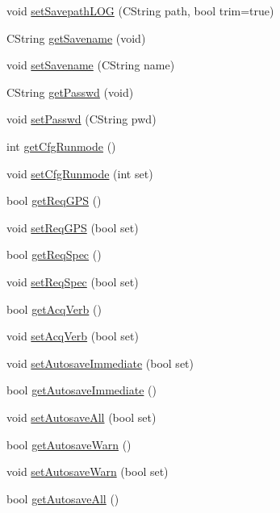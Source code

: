 \begin{DoxyCompactItemize}
\item 
void \hyperlink{classCspec4Cfg_ad3259b17a8c14bddac4b3812ab4dd6f7}{setSavepathLOG} (CString path, bool trim=true)
\item 
CString \hyperlink{classCspec4Cfg_a26c3a0c879839520662be22a06091e16}{getSavename} (void)
\item 
void \hyperlink{classCspec4Cfg_a3a4cfd79bd07ee09cb2ff660f4a81a29}{setSavename} (CString name)
\item 
CString \hyperlink{classCspec4Cfg_aa3610b0f5740435b57663b89df054948}{getPasswd} (void)
\item 
void \hyperlink{classCspec4Cfg_afc866d828800324d3d82d74624a3c9b3}{setPasswd} (CString pwd)
\item 
int \hyperlink{classCspec4Cfg_ae947fa4b6efa25ecdef64e44cd0ca311}{getCfgRunmode} ()
\item 
void \hyperlink{classCspec4Cfg_a027c40c13e60866e5c242c0f31260839}{setCfgRunmode} (int set)
\item 
bool \hyperlink{classCspec4Cfg_a0d22972a9ebb7ef25e225dc0b6e20ef4}{getReqGPS} ()
\item 
void \hyperlink{classCspec4Cfg_a36d877d70c6073b197c65d0abe208398}{setReqGPS} (bool set)
\item 
bool \hyperlink{classCspec4Cfg_ae8966b9d4074f16f8af7ca9381e6958a}{getReqSpec} ()
\item 
void \hyperlink{classCspec4Cfg_a14cf807fa9f0e26975369118d8f3fde8}{setReqSpec} (bool set)
\item 
bool \hyperlink{classCspec4Cfg_ac118e6bff5e5b2af1468e20af5307489}{getAcqVerb} ()
\item 
void \hyperlink{classCspec4Cfg_acac94bf09e172d2a8283361ec4477785}{setAcqVerb} (bool set)
\item 
void \hyperlink{classCspec4Cfg_a2fbec3019a40db34034cf5c02129c2f1}{setAutosaveImmediate} (bool set)
\item 
bool \hyperlink{classCspec4Cfg_abe3d9f1b0207768d1a3aa18517d8ce9b}{getAutosaveImmediate} ()
\item 
void \hyperlink{classCspec4Cfg_aa9ad30c8429d2480b9782b47dc4b2321}{setAutosaveAll} (bool set)
\item 
bool \hyperlink{classCspec4Cfg_afd86e20edfd3060f135535ec1fdbc225}{getAutosaveWarn} ()
\item 
void \hyperlink{classCspec4Cfg_a5ef834a3740b3780963f1d9eb70f496e}{setAutosaveWarn} (bool set)
\item 
bool \hyperlink{classCspec4Cfg_a3fb0573aedea0c9c32be443815ca25cc}{getAutosaveAll} ()
\end{DoxyCompactItemize}
